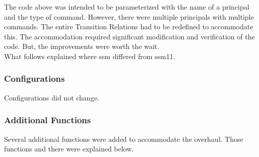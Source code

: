  The code above was intended to be parameterized with the name of a principal and the type of
  command.  However, there were multiple principals with multiple commands.  The entire Transition
  Relations had to be redefined to accommodate this.  The accommodation required significant modification
  and verification of the code.  But, the improvements were worth the wait.  \\
  
  What follows explained where ssm differed from ssm11.

\subsubsection{Configurations}
\label{sec:configurations-2}

  Configurations did not change.

\subsubsection{Additional Functions}
\label{sec:additional-functions}

   Several additional functions were added to accommodate the overhaul. Those functions and
   there were explained below.\\

